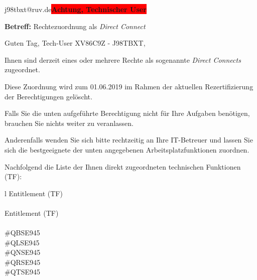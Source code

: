 \documentclass[a4paper,landscape,12pt]{letter}
\begin{document}
\begin{letter}{j98tbxt@ruv.de\space\space\space\space\space\space\space\space\space\bfseries\colorbox{red}{Achtung, Technischer User}\hfill \break}
\begin{normalsize}
	\opening{\textbf{Betreff:} Rechtezuordnung als \emph{Direct Connect}}
	\begin{normalsize} \hfill
	\end{normalsize}

	\begin{normalsize}
		Guten Tag, 
	Tech-User XV86C9Z - J98TBXT, \hfill \break
	\end{normalsize}
	\end{normalsize}
	
\begin{normalsize}
	Ihnen sind derzeit eines oder mehrere Rechte als sogenannte \emph{Direct Connects} zugeordnet.
	
	Diese Zuordnung wird zum 01.06.2019 im Rahmen der aktuellen Rezertifizierung der Berechtigungen gelöscht.
	
	Falls Sie die unten aufgeführte Berechtigung nicht für Ihre Aufgaben benötigen, 
	brauchen Sie nichts weiter zu veranlassen.
	
	Anderenfalls wenden Sie sich bitte rechtzeitig an Ihre IT-Betreuer 
	und lassen Sie sich die bestgeeignete der unten angegebenen Arbeitsplatzfunktionen zuordnen.
	\end{normalsize}
	
\begin{normalsize}
	Nachfolgend die Liste der Ihnen direkt zugeordneten technischen Funktionen (TF):

	\begin{longtable}{l}
		Entitlement (TF) \\ \hline
		\endfirsthead
		\\\hline
		Entitlement (TF) \\ \hline
		\endhead %
		\multicolumn{1}{r@{}}{Fortsetzung \ldots}\\
		\endfoot
		\hline
		\endlastfoot
	\#QBSE945\\\#QLSE945\\\#QNSE945\\\#QRSE945\\\#QTSE945\\
	\end{longtable}
	\end{normalsize}
	

\end{letter}
\end{document}
